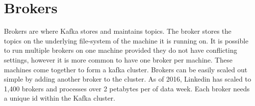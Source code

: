 \section{Brokers}

Brokers are where Kafka stores and maintains topics. The broker stores the topics on the underlying file-system of the machine it is running on. It is possible to run multiple brokers on one machine provided they do not have conflicting settings, however it is more common to have one broker per machine. These machines come together to form a kafka cluster. Brokers can be easily scaled out simple by adding another broker to the cluster. As of 2016, Linkedin has scaled to 1,400 brokers and processes over 2 petabytes per of data week\cite{linkedin:brokers}. Each broker needs a unique id within the Kafka cluster.

